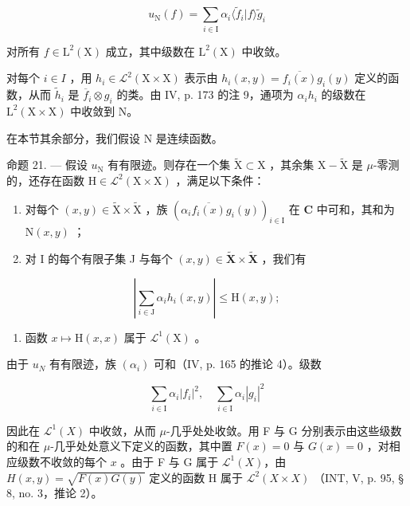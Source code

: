 \[
u _ {\mathrm{N}} (f) = \sum_ {i \in \mathrm{I}} \alpha_ {i} \langle \widetilde {f} _ {i} | f \rangle \widetilde {g} _ {i}\tag{13}
\]

对所有 \(f \in \mathrm{L}^2(\mathrm{X})\) 成立，其中级数在 \(\mathrm{L}^2(\mathrm{X})\) 中收敛。

对每个 \(i \in I\) ，用 \(h_i \in \mathcal{L}^2(\mathrm{X} \times \mathrm{X})\) 表示由 \(h_i(x, y) = \overline{f_i(x)} g_i(y)\) 定义的函数，从而 \(\widetilde{h}_i\) 是 \(\overline{f}_i \otimes g_i\) 的类。由 IV, p. 173 的注 9，通项为 \(\alpha_i h_i\) 的级数在 \(\mathrm{L}^2(\mathrm{X} \times \mathrm{X})\) 中收敛到 N。

在本节其余部分，我们假设 N 是连续函数。

命题 21. --- 假设 \(u_{\mathrm{N}}\) 有有限迹。则存在一个集 \(\widetilde{\mathrm{X}} \subset \mathrm{X}\) ，其余集 \(\mathrm{X} - \widetilde{\mathrm{X}}\) 是 \(\mu\)-零测的，还存在函数 \(\mathrm{H} \in \mathcal{L}^2(\mathrm{X} \times \mathrm{X})\) ，满足以下条件：

\begin{enumerate}
\def\labelenumi{(\roman{enumi})}
\item
  对每个 \((x,y)\in\widetilde{\mathrm{X}}\times\widetilde{\mathrm{X}}\) ，族 \((\alpha_{i}\overline{f_{i}(x)}g_{i}(y))_{i\in\mathrm{I}}\) 在 \(\mathbf{C}\) 中可和，其和为 \(\mathrm{N}(x,y)\) ；
\item
  对 I 的每个有限子集 J 与每个 \((x,y)\in\widetilde{\mathbf{X}}\times\widetilde{\mathbf{X}}\) ，我们有
\end{enumerate}

\[
\left| \sum_ {i \in \mathrm{J}} \alpha_ {i} h _ {i} (x, y) \right| \leqslant \mathrm{H} (x, y);\tag{14}
\]

\begin{enumerate}
\def\labelenumi{(\roman{enumi})}
\setcounter{enumi}{2}
\tightlist
\item
  函数 \(x \mapsto \mathrm{H}(x, x)\) 属于 \(\mathcal{L}^1(\mathrm{X})\) 。
\end{enumerate}

由于 \(u_{N}\) 有有限迹，族 \((\alpha_{i})\) 可和（IV, p. 165 的推论 4）。级数

\[
\sum_ {i \in \mathrm{I}} \alpha_ {i} | f _ {i} | ^ {2}, \quad \sum_ {i \in \mathrm{I}} \alpha_ {i} | g _ {i} | ^ {2}
\]

因此在 \(\mathcal{L}^{1}(X)\) 中收敛，从而 \(\mu\)-几乎处处收敛。用 F 与 G 分别表示由这些级数的和在 \(\mu\)-几乎处处意义下定义的函数，其中置 \(F(x) = 0\) 与 \(G(x) = 0\) ，对相应级数不收敛的每个 \(x\) 。由于 F 与 G 属于 \(\mathcal{L}^{1}(X)\)，由 \(H(x,y) = \sqrt{F(x)G(y)}\) 定义的函数 H 属于 \(\mathcal{L}^{2}(X \times X)\) （INT, V, p. 95, § 8, no. 3，推论 2）。

